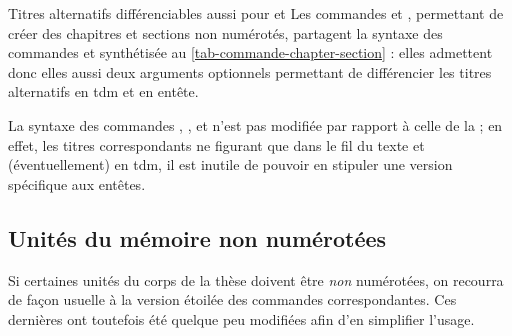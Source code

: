 %
\begin{dbremark}{Titres alternatifs différenciables aussi pour
    \protect{} et \protect{}%
  }{}
  Les commandes  et , permettant
  de créer des chapitres et sections non numérotés, partagent la syntaxe des
  commandes  et  synthétisée au
  \vref{tab-commande-chapter-section} : elles admettent donc elles aussi deux
  arguments optionnels permettant de différencier les titres alternatifs
  en \gls{tdm}\signet{} et en entête.
\end{dbremark}
%
La syntaxe des commandes ,
,  et
 n'est pas modifiée par rapport à celle de la
 ; en effet, les titres correspondants ne figurant que dans le fil
du texte et (éventuellement) en \gls{tdm}\signet{}, il est inutile de pouvoir en
stipuler une version spécifique aux entêtes.
%
\subsection{Unités du mémoire non numérotées}
\label{sec-chap-non-numer}%
%


Si certaines unités du corps de la thèse  doivent être \emph{non}
numérotées, on recourra de façon usuelle à la version étoilée des commandes
correspondantes. Ces dernières ont toutefois été quelque peu modifiées afin d'en
simplifier l'usage.


